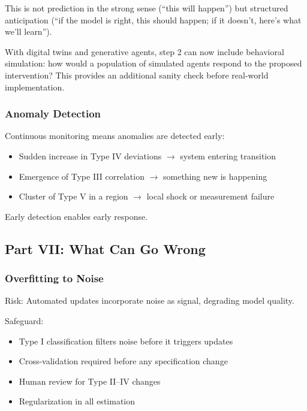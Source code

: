 This is not prediction in the strong sense (``this will happen'') but 
structured anticipation (``if the model is right, this should happen; if it 
doesn't, here's what we'll learn'').

With digital twins and generative agents, step 2 can now include behavioral 
simulation: how would a population of simulated agents respond to the proposed 
intervention? This provides an additional sanity check before real-world 
implementation.

\subsubsection{Anomaly Detection}

Continuous monitoring means anomalies are detected early:
\begin{itemize}
    \item Sudden increase in Type IV deviations $\rightarrow$ system entering transition
    \item Emergence of Type III correlation $\rightarrow$ something new is happening
    \item Cluster of Type V in a region $\rightarrow$ local shock or measurement failure
\end{itemize}

Early detection enables early response.

\subsection{Part VII: What Can Go Wrong}

\subsubsection{Overfitting to Noise}

Risk: Automated updates incorporate noise as signal, degrading model quality.

Safeguard: 
\begin{itemize}
    \item Type I classification filters noise before it triggers updates
    \item Cross-validation required before any specification change
    \item Human review for Type II--IV changes
    \item Regularization in all estimation
\end{itemize}

